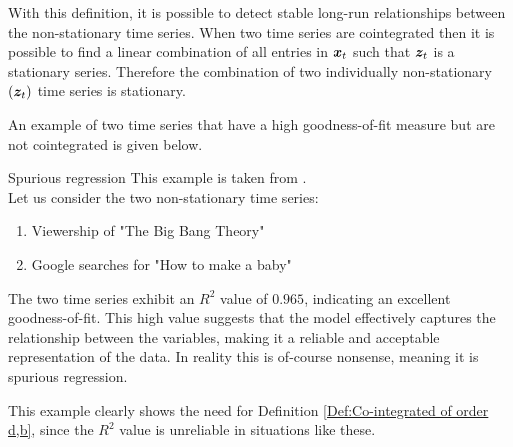 \noindent With this definition, it is possible to detect stable long-run relationships between the non-stationary time series. When two time series are cointegrated then it is possible to find a linear combination of all entries in $\boldsymbol{x}_t$ such that $\boldsymbol{z}_t$ is a stationary series. Therefore the combination of two individually non-stationary $(\boldsymbol{z}_t)$ time series is stationary.
 



\noindent An example of two time series that have a high goodness-of-fit measure but are not cointegrated is given below. 
\begin{ekse}{Spurious regression}
This example is taken from \cite{Spurious_example}.\\
    Let us consider the two non-stationary time series:
    \begin{enumerate}
        \item Viewership of "The Big Bang Theory"
        \item Google searches for "How to make a baby"
    \end{enumerate}
  The two time series exhibit an $R^2$ value of $0.965$, indicating an excellent goodness-of-fit. This high value suggests that the model effectively captures the relationship between the variables, making it a reliable and acceptable representation of the data. In reality this is of-course nonsense, meaning it is spurious regression.
\end{ekse}
\noindent This example clearly shows the need for Definition \ref{Def:Co-integrated of order d,b}, since the $R^2$ value is unreliable in situations like these.
\begin{comment}
\begin{defi}{Error Correction}
    A vector time series $x_t$ can be expressed using error correction if it can be written as:
    \begin{align*}
        A(B)(1-B)x_t=-\gamma z_{t_{t-1}}+u_t
    \end{align*}
    where $u_t$ is a stationary multivariate disturbance, $A(0)=I$, $A(1)$ has all elements finite, $z_\tau=\alpha^Tx_\tau$ and $\gamma\neq0$.
\end{defi}
Definition from \cite{co-Integration_and_error_correction}
The error correction model is a tool used when 
\end{comment}


